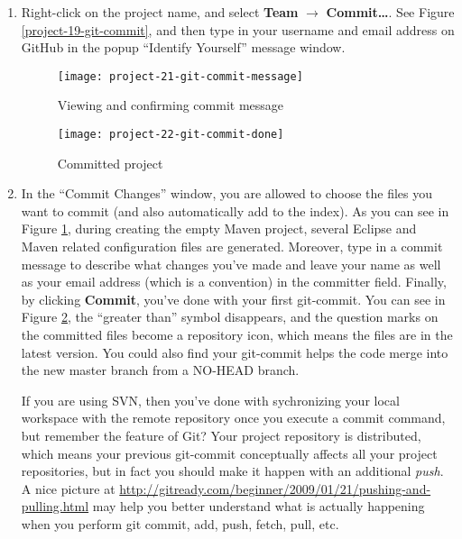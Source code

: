 \begin{enumerate}

\item Right-click on the project name, and select \textbf{Team} $\rightarrow$ \textbf{Commit\ldots}. See Figure \ref{project-19-git-commit}, and then type in your username and email address on GitHub in the popup ``Identify Yourself'' message window.

\begin{figure}[t]
\centering
\texttt{[image: project-21-git-commit-message]}
\caption{Viewing and confirming commit message\label{project-21-git-commit-message}}
\end{figure}

\begin{figure}[t]
\centering
\texttt{[image: project-22-git-commit-done]}
\caption{Committed project\label{project-22-git-commit-done}}
\end{figure}

\item In the ``Commit Changes'' window, you are allowed to choose the files you want to commit (and also automatically add to the index). As you can see in Figure \ref{project-21-git-commit-message}, during creating the empty Maven project, several Eclipse and Maven related configuration files are generated. Moreover, type in a commit message to describe what changes you've made and leave your name as well as your email address (which is a convention) in the committer field. Finally, by clicking \textbf{Commit}, you've done with your first git-commit. You can see in Figure \ref{project-22-git-commit-done}, the ``greater than'' symbol disappears, and the question marks on the committed files become a repository icon, which means the files are in the latest version. You could also find your git-commit helps the code merge into the new master branch from a NO-HEAD branch.

If you are using SVN, then you've done with sychronizing your local workspace with the remote repository once you execute a commit command, but remember the feature of Git? Your project repository is distributed, which means your previous git-commit conceptually affects all your project repositories, but in fact you should make it happen with an additional \emph{push}. A nice picture at \url{http://gitready.com/beginner/2009/01/21/pushing-and-pulling.html} may help you better understand what is actually happening when you perform git commit, add, push, fetch, pull, etc.


\end{enumerate}
